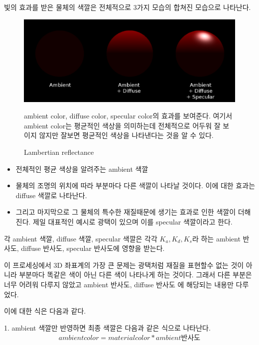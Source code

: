 \documentclass{gshs_thesis}
\theoremstyle{theorem}
\theoremstyle{lemma}
\theoremstyle{definition}
\begin{document}
빛의 효과를 받은 물체의 색깔은 전체적으로 3가지 모습의 합쳐진 모습으로 나타난다.
\begin{figure}[h]
	\begin{center}
		\includegraphics[width=.9\textwidth]{image/lambert3}
	\end{center} 
    \caption{Lambertian reflectance}
	\raggedright \small
	ambient color, diffuse color, specular color의 효과를 보여준다. 여기서 ambient color는 평균적인 색상을 의미하는데 전체적으로 어두워 잘 보이지 않지만 잘보면 평균적인 색상을 나타낸다는 것을 알 수 있다.
\end{figure}
\begin{itemize}
	\item 전체적인 평균 색상을 알려주는 ambient 색깔
	\item 물체의 조명의 위치에 따라 부분마다 다른 색깔이 나타날 것이다. 이에 대한 효과는 diffuse 색깔로 나타난다.
	\item 그리고 마지막으로 그 물체의 특수한 재질때문에 생기는 효과로 인한 색깔이 더해진다. 제일 대표적인 예시로 광택이 있으며 이를 specular 색깔이라고 한다.
\end{itemize}
각 ambient 색깔, diffuse 색깔, specular 색깔은 각각 $K_{a}, K_{d}, K_{s}$라 하는 ambient 반사도, diffuse 반사도, specular 반사도에 영향을 받는다. 

이 프로세싱에서 3D 좌표계의 가장 큰 문제는 광택처럼 재질을 표현할수 없는 것이 아니라 부분마다 똑같은 색이 아닌 다른 색이 나타나게 하는 것이다. 그래서 다른 부분은 너무 어려워 다루지 않았고 ambient 반사도, diffuse 반사도 에 해당되는 내용만 다루었다.

이에 대한 식은 다음과 같다.

1. ambient 색깔만 반영하면 최종 색깔은 다음과 같은 식으로 나타난다.
\begin{equation*}
	\begin{split}
		ambient color=material color* ambient 반사도
	\end{split}
\end{equation*}
\end{document}
